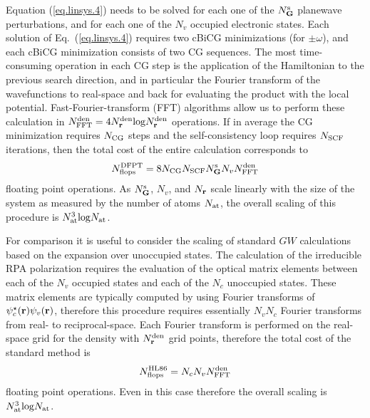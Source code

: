 \documentclass[twocolumn,prb,showpacs,superscriptaddress]{revtex4}
\def\w{\omega}
\def\G{{\bf G}}
\def\r{{\bf r}}
\begin{document}
Equation (\ref{eq.linsys.4}) needs to be solved for each one of the $N_\G^{\rm s}$ planewave perturbations,
and for each one of the $N_v$ occupied electronic states.
Each solution of Eq.\ (\ref{eq.linsys.4}) requires two cBiCG minimizations
(for $\pm\w$), and each cBiCG minimization consists of two CG sequences.
The most time-consuming operation in each CG step is the application of the Hamiltonian 
to the previous search direction, and in particular
the Fourier transform of the wavefunctions to real-space and back for evaluating
the product with the local potential. Fast-Fourier-transform (FFT)
algorithms allow us to perform these calculation in $N^{\rm den}_{\rm FFT} = 4 N_\r^{\rm den} {\rm log} N_\r^{\rm den}$ operations.\cite{frigo}
If in average the CG minimization requires $N_{\rm CG}$ steps
and the self-consistency loop requires $N_{\rm SCF}$ iterations,
then the total cost of the entire calculation corresponds to
   \begin{equation}\label{eq.scaling.1}
   N^{\rm DFPT}_{\rm flops} = 8 N_{\rm CG} N_{\rm SCF} N_\G^{\rm s}  N_v N^{\rm den}_{\rm FFT}
   \end{equation}
floating point operations.
As $N_\G^{\rm s}$, $N_v$, and $N_\r$ scale linearly with the size of the system
as measured by the number of atoms $N_{\rm at}$,
the overall scaling of this procedure is $N_{\rm at}^3 {\rm log} N_{\rm at}$.

For comparison it is useful to consider the scaling of standard $GW$ calculations
based on the expansion over unoccupied states.\cite{hl86} 
The calculation of the irreducible RPA polarization requires the evaluation of the 
optical matrix elements between each of the $N_v$ occupied states and each of the $N_c$ unoccupied states.
These matrix elements are typically computed by using Fourier transforms of $\psi_c^\star(\r)\psi_v(\r)$,
therefore this procedure requires essentially $N_v N_c$ Fourier transforms from real- to reciprocal-space.
Each Fourier transform is performed on the real-space grid for the density with $N_\r^{\rm den}$ grid points, 
therefore the total cost of the standard method is
   \begin{equation}\label{eq.scaling.2}
   N^{\rm HL86}_{\rm flops} = N_c  N_v N^{\rm den}_{\rm FFT}
   \end{equation}
floating point operations.
Even in this case therefore the overall scaling is $N_{\rm at}^3 {\rm log} N_{\rm at}$.
\end{document}
